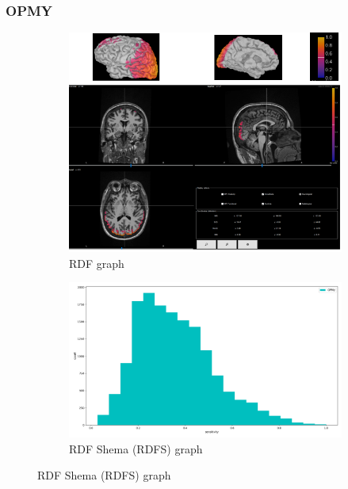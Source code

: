 \documentclass{beamer}
\numberwithin{figure}{section}
\numberwithin{equation}{section}
\begin{document}

\section{}
\begin{frame}
 \frametitle{OPMY}
  

 	\begin{figure}[h]
        \begin{subfigure}[h]{0.53\linewidth} 
            \includegraphics[width=\linewidth]{pictures/OPMY2}
            \caption{\tiny RDF graph}
            \label{fig:rdf_graph}
        \end{subfigure}       
        \begin{subfigure}[h]{0.45\linewidth} 
            \includegraphics[width=\linewidth]{pictures/HISTopmy1}
            \caption{\tiny RDF Shema (RDFS) graph}
            \label{fig:rdfs_graph}
        \end{subfigure}
    \end{figure}

  
\end{frame}
\end{document}
